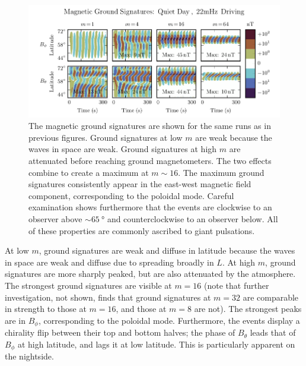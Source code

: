 \documentclass[draft,linenumbers]{agujournal}
\begin{document}
\begin{figure}
    \begin{center}
    \includegraphics[width=\textwidth]{figures/fig_ground_day.pdf}
    \caption{
        The magnetic ground signatures are shown for the same runs as in previous figures. Ground signatures at low $m$ are weak because the waves in space are weak. Ground signatures at high $m$ are attenuated before reaching ground magnetometers. The two effects combine to create a maximum at $m \sim 16$. The maximum ground signatures consistently appear in the east-west magnetic field component, corresponding to the poloidal mode. Careful examination shows furthermore that the events are clockwise to an observer above $\sim\SI{65}{\degree}$ and counterclockwise to an observer below. All of these properties are commonly ascribed to giant pulsations.
    }
    \label{fig_ground_day}
    \end{center}
\end{figure}

At low $m$, ground signatures are weak and diffuse in latitude because the waves in space are weak and diffuse due to spreading broadly in $L$. At high $m$, ground signatures are more sharply peaked, but are also attenuated by the atmosphere. The strongest ground signatures are visible at $m = 16$ (note that further investigation, not shown, finds that ground signatures at $m = 32$ are comparable in strength to those at $m = 16$, and those at $m = 8$ are not). The strongest peaks are in $B_\phi$, corresponding to the poloidal mode. Furthermore, the events display a chirality flip between their top and bottom halves; the phase of $B_\theta$ leads that of $B_\phi$ at high latitude, and lags it at low latitude. This is particularly apparent on the nightside.
\end{document}
